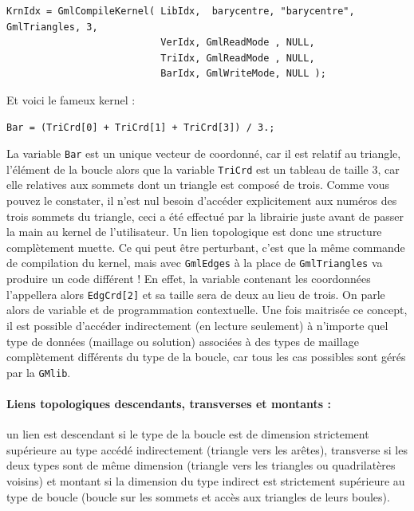 \documentclass[a4paper,12pt]{article}
\begin{document}
\begin{tt}
\begin{verbatim}
KrnIdx = GmlCompileKernel( LibIdx,  barycentre, "barycentre", GmlTriangles, 3,
                           VerIdx, GmlReadMode , NULL,
                           TriIdx, GmlReadMode , NULL,
                           BarIdx, GmlWriteMode, NULL );
\end{verbatim}
\end{tt}
\normalfont

Et voici le fameux kernel : 

\begin{tt}
\begin{verbatim}
Bar = (TriCrd[0] + TriCrd[1] + TriCrd[3]) / 3.;
\end{verbatim}
\end{tt}
\normalfont

La variable {\tt Bar} est un unique vecteur de coordonné, car il est relatif au triangle, l'élément de la boucle alors que la variable {\tt TriCrd} est un tableau de taille 3, car elle relatives aux sommets dont un triangle est composé de trois.
Comme vous pouvez le constater, il n'est nul besoin d'accéder explicitement aux numéros des trois sommets du triangle, ceci a été effectué par la librairie juste avant de passer la main au kernel de l'utilisateur. Un lien topologique est donc une structure complètement muette.
Ce qui peut être perturbant, c'est que la même commande de compilation du kernel, mais avec {\tt GmlEdges} à la place de {\tt GmlTriangles} va produire un code différent !
En effet, la variable contenant les coordonnées l'appellera alors {\tt EdgCrd[2]} et sa taille sera de deux au lieu de trois.
On parle alors de variable et de programmation contextuelle.
Une fois maitrisée ce concept, il est possible d'accéder indirectement (en lecture seulement) à n'importe quel type de données (maillage ou solution) associées à des types de maillage complètement différents du type de la boucle, car tous les cas possibles sont gérés par la {\tt GMlib}.

\paragraph{Liens topologiques descendants, transverses et montants :} un lien est descendant si le type de la boucle est de dimension strictement supérieure au type accédé indirectement (triangle vers les arêtes), transverse si les deux types sont de même dimension (triangle vers les triangles ou quadrilatères voisins) et montant si la dimension du type indirect est strictement supérieure au type de boucle (boucle sur les sommets et accès aux triangles de leurs boules).
\end{document}

